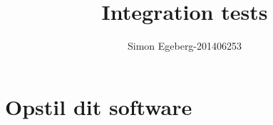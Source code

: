 \documentclass{article}
\title{Integration tests}
\author{Simon Egeberg-201406253}
\begin{document}
\maketitle
\section{Opstil dit software}
\end{document}
